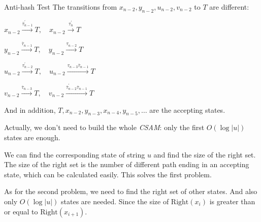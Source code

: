 \begin{tutorial}{Anti-hash Test}
The transitions from $x_{n-2},y_{n-2},u_{n-2},v_{n-2}$ to $T$ are different:

$x_{n-2} \overset{\overline{\tau}^\prime_{n-1}}{\longrightarrow} T, \quad x_{n-2} \overset{\tau^\prime_n}{\longrightarrow} T$

$y_{n-2} \overset{\overline{\tau}_{n-1}}{\longrightarrow} T, \quad y_{n-2} \overset{\tau_{n-2}}{\longrightarrow} T$

$u_{n-2} \overset{\tau^\prime_{n-2}}{\longrightarrow} T, \quad u_{n-2} \overset{\tau_{n-3} \overline{\tau}_{n-1}}{\longrightarrow} T$

$v_{n-2} \overset{\overline{\tau}_{n-3}}{\longrightarrow} T, \quad v_{n-2} \overset{\overline{\tau}^\prime_{n-2} \overline{\tau}_{n-1}}{\longrightarrow} T$

And in addition, $T,x_{n-2},y_{n-3},x_{n-4},y_{n-5}, \ldots$ are the accepting states.

Actually, we don't need to build the whole \textit{CSAM}: only the first $O(\log |u|)$ states are enough.

We can find the corresponding state of string $u$ and find the size of the right set. The size of the right set is the number of different path ending in an accepting state, which can be calculated easily. This solves the first problem.

As for the second problem, we need to find the right set of other states. And also only $O(\log |u|)$ states are needed. Since the size of $\mathrm{Right}(x_i)$ is greater than or equal to $\mathrm{Right}(x_{i+1})$.

\end{tutorial}
